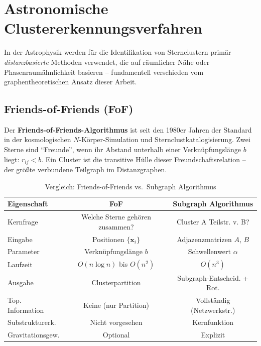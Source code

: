 ﻿\documentclass[a4paper,12pt]{report}
\theoremstyle{definition}
\begin{document}
\section{Astronomische Clustererkennungsverfahren}
\label{sec:related_astro}

In der Astrophysik werden für die Identifikation von Sternclustern primär \emph{distanzbasierte} Methoden verwendet, die auf räumlicher Nähe oder Phasenraumähnlichkeit basieren -- fundamentell verschieden vom graphentheoretischen Ansatz dieser Arbeit.

\subsection{Friends-of-Friends (FoF)}
\label{ssec:fof}

Der \textbf{Friends-of-Friends-Algorithmus} \cite{davis1985} ist seit den 1980er Jahren der Standard in der kosmologischen $N$-Körper-Simulation und Sternclustkatalogisierung. Zwei Sterne sind ``Freunde'', wenn ihr Abstand unterhalb einer Verknüpfungslänge $b$ liegt: $r_{ij} < b$. Ein Cluster ist die transitive Hülle dieser Freundschaftsrelation -- der größte verbundene Teilgraph im Distanzgraphen.

\begin{table}[H]
\centering
\caption{Vergleich: Friends-of-Friends vs.\ Subgraph Algorithmus}
\label{tab:fof}
\begin{tabular}{lcc}
\toprule
Eigenschaft & FoF & Subgraph Algorithmus \\
\midrule
Kernfrage & Welche Sterne gehören zusammen? & Cluster A Teilstr. v. B? \\
Eingabe & Positionen $\{\mathbf{x}_i\}$ & Adjazenzmatrizen $A$, $B$ \\
Parameter & Verknüpfungslänge $b$ & Schwellenwert $\alpha$ \\
Laufzeit & $O(n \log n)$ bis $O(n^2)$ & $O(n^3)$ \\
Ausgabe & Clusterpartition & Subgraph-Entscheid. + Rot. \\
Top. Information & Keine (nur Partition) & Vollständig (Netzwerkstr.) \\
Substrukturerk. & Nicht vorgesehen & Kernfunktion \\
Gravitationsgew. & Optional & Explizit \\
\bottomrule
\end{tabular}
\end{table}
\end{document}
